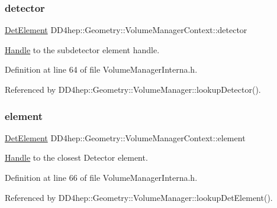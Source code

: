 \subsubsection{\texorpdfstring{detector}{detector}}
{\footnotesize\ttfamily \hyperlink{class_d_d4hep_1_1_geometry_1_1_det_element}{Det\+Element} D\+D4hep\+::\+Geometry\+::\+Volume\+Manager\+Context\+::detector}



\hyperlink{class_d_d4hep_1_1_handle}{Handle} to the subdetector element handle. 



Definition at line 64 of file Volume\+Manager\+Interna.\+h.



Referenced by D\+D4hep\+::\+Geometry\+::\+Volume\+Manager\+::lookup\+Detector().

\hypertarget{class_d_d4hep_1_1_geometry_1_1_volume_manager_context_a57c697291054cc0fa221f047dd32938f}{}\label{class_d_d4hep_1_1_geometry_1_1_volume_manager_context_a57c697291054cc0fa221f047dd32938f} 
\subsubsection{\texorpdfstring{element}{element}}
{\footnotesize\ttfamily \hyperlink{class_d_d4hep_1_1_geometry_1_1_det_element}{Det\+Element} D\+D4hep\+::\+Geometry\+::\+Volume\+Manager\+Context\+::element}



\hyperlink{class_d_d4hep_1_1_handle}{Handle} to the closest Detector element. 



Definition at line 66 of file Volume\+Manager\+Interna.\+h.



Referenced by D\+D4hep\+::\+Geometry\+::\+Volume\+Manager\+::lookup\+Det\+Element().

\hypertarget{class_d_d4hep_1_1_geometry_1_1_volume_manager_context_a22e82a0219d1d0249ea2d1b034ef7264}{}\label{class_d_d4hep_1_1_geometry_1_1_volume_manager_context_a22e82a0219d1d0249ea2d1b034ef7264} 
